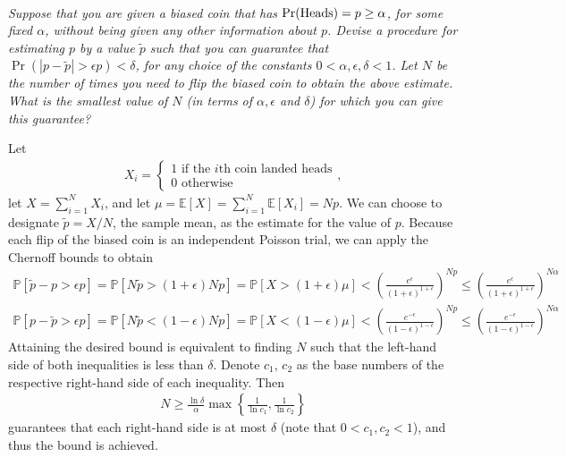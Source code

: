 \documentclass{article}
\begin{document}
\\
\emph{Suppose that you are given a biased coin that has $\Pr ( {\rm Heads } )=p \geq \alpha$,
for some fixed $\alpha$, without being given any other information about $p$. 
Devise a procedure for estimating $p$ by a value $\tilde{p}$ such that you can guarantee 
that $\Pr ( |p-\tilde{p}| > \epsilon p   ) < \delta$, 
for any choice of the constants $0< \alpha, \epsilon, \delta < 1$.
Let $N$ be the number of times you need to flip the biased coin 
to obtain the above estimate. 
What is the smallest value of $N$ (in terms of $\alpha, \epsilon$ and $\delta$)
for which you can give this guarantee?} \par
Let
\begin{align*}
    X_i = \begin{cases}
        1 \text{ if the $i$th coin landed heads} \\
        0 \text{ otherwise}
    \end{cases},
\end{align*}
let $X = \sum_{i = 1}^N X_i$, and let $\mu = \mathbb{E}[X] = \sum_{i = 1}^N \mathbb{E}[X_i] = Np$. We can choose to designate $\tilde{p} = X/N$, the sample mean, as the estimate for the value of $p$. Because each flip of the biased coin is an independent Poisson trial, we can apply the Chernoff bounds to obtain
\begin{gather*}
    \mathbb{P}[\tilde{p} - p > \epsilon p] = \mathbb{P}[N\tilde{p} > (1 + \epsilon)Np] = \mathbb{P}[X > (1 + \epsilon)\mu] < \left( \frac{e^\epsilon}{(1 + \epsilon)^{1 + \epsilon}} \right)^{Np} \leq \left( \frac{e^\epsilon}{(1 + \epsilon)^{1 + \epsilon}} \right)^{N\alpha} \\
    \mathbb{P}[p - \tilde{p} > \epsilon p] = \mathbb{P}[N\tilde{p} < (1 - \epsilon)Np] = \mathbb{P}[X < (1 - \epsilon)\mu] < \left( \frac{e^{-\epsilon}}{(1 - \epsilon)^{1 - \epsilon}} \right)^{Np} \leq \left( \frac{e^{-\epsilon}}{(1 - \epsilon)^{1 - \epsilon}} \right)^{N\alpha}
\end{gather*}
Attaining the desired bound is equivalent to finding $N$ such that the left-hand side of both inequalities is less than $\delta$. Denote $c_1$, $c_2$ as the base numbers of the respective right-hand side of each inequality. Then
\begin{align*}
    N \geq \frac{\ln\delta}{\alpha} \max\left\{ \frac{1}{\ln c_1}, \frac{1}{\ln c_2} \right\}
\end{align*}
guarantees that each right-hand side is at most $\delta$ (note that $0 < c_1, c_2 < 1$), and thus the bound is achieved. \\
\end{document}
